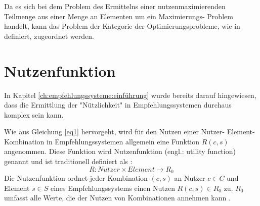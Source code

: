 Da es sich bei dem Problem des Ermittelns einer nutzenmaximierenden Teilmenge aus einer Menge an Elementen um ein Maximierungs- Problem handelt, kann das Problem der Kategorie der Optimierungsprobleme, wie in \textcite[S. 1]{book:kallrath} definiert, zugeordnet werden.

\section{Nutzenfunktion} %
\label{ch:empfehlungssysteme:nutzenfunktion}
In Kapitel \ref{ch:empfehlungssysteme:einführung} wurde bereits darauf hingewiesen, dass die Ermittlung der "Nützlichkeit" in Empfehlungssystemen durchaus komplex sein kann.

Wie aus Gleichung \ref{eq1} hervorgeht, wird für den Nutzen einer Nutzer- Element- Kombination in Empfehlungssystemen allgemein eine Funktion $R(c,s)$ angenommen.
Diese Funktion wird Nutzenfunktion (engl.: utility function) genannt und ist traditionell definiert als \cite[S. 195]{adomavicius:3:inbook}\cite[S. 3]{jawaheer:article}:
\begin{equation}\label{eq2}%
    R: Nutzer \times Element \rightarrow R_{0}
\end{equation}
Die Nutzenfunktion ordnet jeder Kombination $(c,s)$ an Nutzer $c \in C$ und Element $s \in S$ eines Empfehlungssystems einen Nutzen $R(c,s) \in R_{0}$ zu.
$R_{0}$ umfasst alle Werte, die der Nutzen von Kombinationen annehmen kann \cite[S. 49f]{adomavicius:inproceedings:2}.

